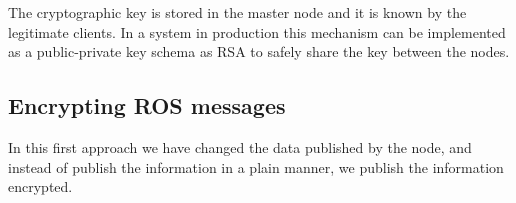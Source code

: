 \documentclass[journal,twoside]{JoPhA}
\begin{document}


The cryptographic key  is stored in the master node and it is known by the legitimate clients. In a system in production this mechanism can be implemented as a public-private key schema as RSA  to safely share the key between the nodes. 









\subsection{Encrypting ROS messages}



In this first approach we have changed the data published by the node, and instead of publish the information in a plain manner, we publish the information encrypted. 
\end{document}
